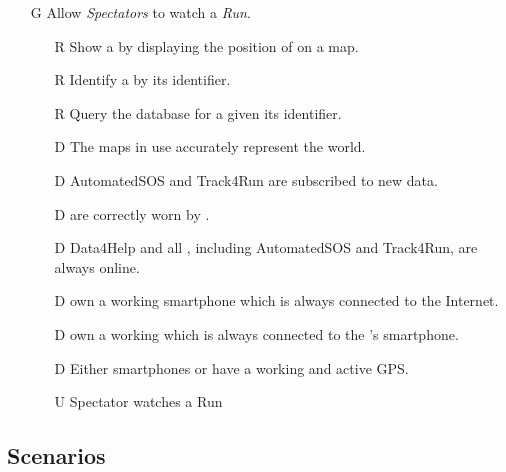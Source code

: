 \documentclass[../../rasd.tex]{subfiles}
\begin{document}
\begin{itemize}
            \item[G\subs{10}]Allow \textit{Spectators} to watch a \textit{Run}.
            \begin{itemize}
                \item[R\subs{46}]Show a  by displaying the position of  on a map.
                \item[R\subs{47}]Identify a  by its identifier.
                \item[R\subs{48}]Query the database for a  given its identifier.
                \\
                \item[D\subs{3}]The maps in use accurately represent the world.
                \item[D\subs{6}]AutomatedSOS and Track4Run are subscribed to new data.
                \item[D\subs{8}] are correctly worn by .
                \item[D\subs{9}]Data4Help and all , including AutomatedSOS and Track4Run, are always online.
                \item[D\subs{10}] own a working smartphone which is always connected to the Internet.
                \item[D\subs{11}] own a working  which is always connected to the 's smartphone.
                \item[D\subs{12}]Either smartphones or  have a working and active GPS.
                \\
                \item[U\subs{15}]Spectator watches a Run
            \end{itemize}
        \end{itemize}











        \subsection{Scenarios}
\end{document}
